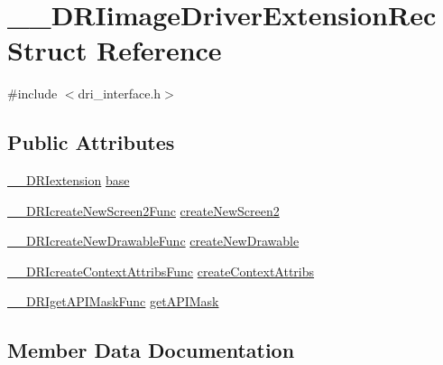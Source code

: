 \hypertarget{struct_____d_r_iimage_driver_extension_rec}{}\section{\+\_\+\+\_\+\+D\+R\+Iimage\+Driver\+Extension\+Rec Struct Reference}
\label{struct_____d_r_iimage_driver_extension_rec}


{\ttfamily \#include $<$dri\+\_\+interface.\+h$>$}

\subsection*{Public Attributes}
\begin{DoxyCompactItemize}
\item 
\hyperlink{dri__interface_8h_a4e0a61c8ece00d2b2c6792a9a1b55385}{\+\_\+\+\_\+\+D\+R\+Iextension} \hyperlink{struct_____d_r_iimage_driver_extension_rec_a569fa0467a17bde450e15e272d41045b}{base}
\item 
\hyperlink{dri__interface_8h_a2055c7208f40b9580b75148d76365262}{\+\_\+\+\_\+\+D\+R\+Icreate\+New\+Screen2\+Func} \hyperlink{struct_____d_r_iimage_driver_extension_rec_a0a31031ccb70ba96a729ac2bd8691bf1}{create\+New\+Screen2}
\item 
\hyperlink{dri__interface_8h_ac32374b98e1c97cd35c2d247455c0a57}{\+\_\+\+\_\+\+D\+R\+Icreate\+New\+Drawable\+Func} \hyperlink{struct_____d_r_iimage_driver_extension_rec_a24ce4797994bd970653c630fa9a65ce8}{create\+New\+Drawable}
\item 
\hyperlink{dri__interface_8h_a4f3d1005ed90cec052090fda5340fbfc}{\+\_\+\+\_\+\+D\+R\+Icreate\+Context\+Attribs\+Func} \hyperlink{struct_____d_r_iimage_driver_extension_rec_ae5977240d8539278bef7aa4da7d00f44}{create\+Context\+Attribs}
\item 
\hyperlink{dri__interface_8h_a89f080ad71d4ec1295cb23c069e086e6}{\+\_\+\+\_\+\+D\+R\+Iget\+A\+P\+I\+Mask\+Func} \hyperlink{struct_____d_r_iimage_driver_extension_rec_af94d99d24ec2133571f7c6930cc4650f}{get\+A\+P\+I\+Mask}
\end{DoxyCompactItemize}


\subsection{Member Data Documentation}
\mbox{\label{struct_____d_r_iimage_driver_extension_rec_a569fa0467a17bde450e15e272d41045b}} 
